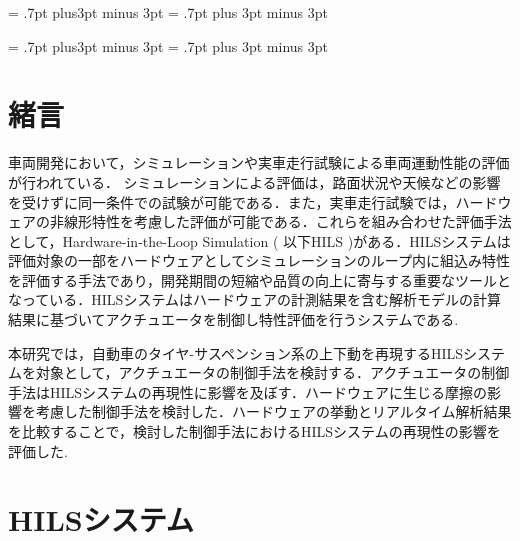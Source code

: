 \documentclass{article_vdlab_sotsuron_youshi}
\begin{document}
\kanjiskip = .7pt plus3pt minus 3pt
\xkanjiskip = .7pt plus 3pt minus 3pt
\small
{}

\setlength{\abovecaptionskip}{0mm}
\setlength{\belowcaptionskip}{0mm}
\setlength{\floatsep}{0mm}
\setlength{\textfloatsep}{0mm}
\setlength{\intextsep}{3mm}
\setlength{\dblfloatsep}{0mm}
\setlength{\dbltextfloatsep}{0mm}



\kanjiskip = .7pt plus3pt minus 3pt
\xkanjiskip = .7pt plus 3pt minus 3pt
\small
{}

\section{緒言}
車両開発において，シミュレーションや実車走行試験による車両運動性能の評価が行われている．
シミュレーションによる評価は，路面状況や天候などの影響を受けずに同一条件での試験が可能である．また，実車走行試験では，ハードウェアの非線形特性を考慮した評価が可能である．これらを組み合わせた評価手法として，Hardware-in-the-Loop Simulation ( 以下HILS )がある．HILSシステムは評価対象の一部をハードウェアとしてシミュレーションのループ内に組込み特性を評価する手法であり，開発期間の短縮や品質の向上に寄与する重要なツールとなっている\cite{1}．HILSシステムはハードウェアの計測結果を含む解析モデルの計算結果に基づいてアクチュエータを制御し特性評価を行うシステムである.\par
本研究では，自動車のタイヤ-サスペンション系の上下動を再現するHILSシステムを対象として，アクチュエータの制御手法を検討する．アクチュエータの制御手法はHILSシステムの再現性に影響を及ぼす．ハードウェアに生じる摩擦の影響を考慮した制御手法を検討した．ハードウェアの挙動とリアルタイム解析結果を比較することで，検討した制御手法におけるHILSシステムの再現性の影響を評価した.
\section{HILSシステム}
\end{document}
